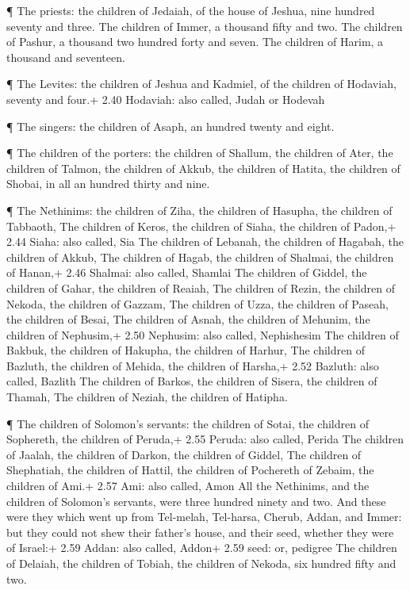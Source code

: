  ¶ The priests: the children of Jedaiah, of the house of
Jeshua, nine hundred seventy and three.  The children of
Immer, a thousand fifty and two.  The children of Pashur, a
thousand two hundred forty and seven.  The children of
Harim, a thousand and seventeen.

 ¶ The Levites: the children of Jeshua and Kadmiel, of the
children of Hodaviah, seventy and four.+ 2.40 Hodaviah: also called,
Judah or Hodevah

 ¶ The singers: the children of Asaph, an hundred twenty
and eight.

 ¶ The children of the porters: the children of Shallum,
the children of Ater, the children of Talmon, the children of Akkub, the
children of Hatita, the children of Shobai, in all an hundred thirty and
nine.

 ¶ The Nethinims: the children of Ziha, the children of
Hasupha, the children of Tabbaoth,  The children of Keros,
the children of Siaha, the children of Padon,+ 2.44 Siaha: also called,
Sia  The children of Lebanah, the children of Hagabah, the
children of Akkub,  The children of Hagab, the children of
Shalmai, the children of Hanan,+ 2.46 Shalmai: also called, Shamlai
 The children of Giddel, the children of Gahar, the
children of Reaiah,  The children of Rezin, the children of
Nekoda, the children of Gazzam,  The children of Uzza, the
children of Paseah, the children of Besai,  The children of
Asnah, the children of Mehunim, the children of Nephusim,+ 2.50
Nephusim: also called, Nephishesim  The children of Bakbuk,
the children of Hakupha, the children of Harhur,  The
children of Bazluth, the children of Mehida, the children of Harsha,+
2.52 Bazluth: also called, Bazlith  The children of Barkos,
the children of Sisera, the children of Thamah,  The
children of Neziah, the children of Hatipha.

 ¶ The children of Solomon's servants: the children of
Sotai, the children of Sophereth, the children of Peruda,+ 2.55 Peruda:
also called, Perida  The children of Jaalah, the children
of Darkon, the children of Giddel,  The children of
Shephatiah, the children of Hattil, the children of Pochereth of Zebaim,
the children of Ami.+ 2.57 Ami: also called, Amon  All the
Nethinims, and the children of Solomon's servants, were three hundred
ninety and two.  And these were they which went up from
Tel-melah, Tel-harsa, Cherub, Addan, and Immer: but they could not shew
their father's house, and their seed, whether they were of Israel:+ 2.59
Addan: also called, Addon+ 2.59 seed: or, pedigree  The
children of Delaiah, the children of Tobiah, the children of Nekoda, six
hundred fifty and two.

